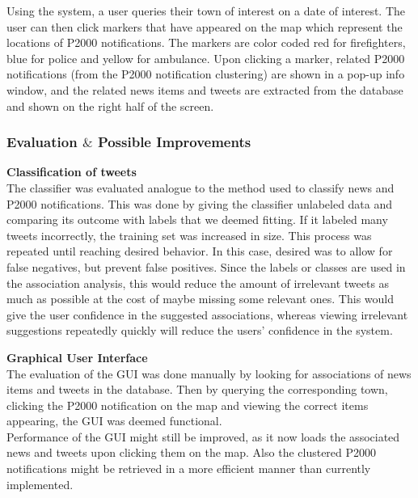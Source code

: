 Using the system, a user queries their town of interest on a date of interest. The user can then click markers that have appeared on the map which represent the locations of P2000 notifications. The markers are color coded red for firefighters, blue for police and yellow for ambulance. Upon clicking a marker, related P2000 notifications (from the P2000 notification clustering) are shown in a pop-up info window, and the related news items and tweets are extracted from the database and shown on the right half of the screen. \\


\subsubsection*{Evaluation $\&$ Possible Improvements}
\textbf{Classification of tweets}\\
The classifier was evaluated analogue to the method used to classify news and P2000 notifications. This was done by giving the classifier unlabeled data and comparing its outcome with labels that we deemed fitting. If it labeled many tweets incorrectly, the training set was increased in size. This process was repeated until reaching desired behavior. In this case, desired was to allow for false negatives, but prevent false positives. Since the labels or classes are used in the association analysis, this would reduce the amount of irrelevant tweets as much as possible at the cost of maybe missing some relevant ones. This would give the user confidence in the suggested associations, whereas viewing irrelevant suggestions repeatedly quickly will reduce the users' confidence in the system.

\textbf{Graphical User Interface}\\
The evaluation of the GUI was done manually by looking for associations of news items and tweets in the database. Then by querying the corresponding town, clicking the P2000 notification on the map and viewing the correct items appearing, the GUI was deemed functional. \\

Performance of the GUI might still be improved, as it now loads the associated news and tweets upon clicking them on the map. Also the clustered P2000 notifications might be retrieved in a more efficient manner than currently implemented. 
